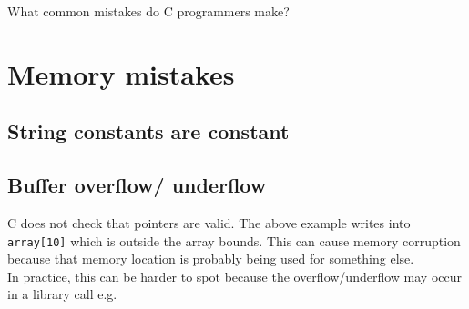 What common mistakes do C programmers make?

\section{Memory mistakes}\label{memory-mistakes}

\subsection{String constants are
constant}\label{string-constants-are-constant}

\begin{Shaded}
\begin{Highlighting}[]
 \NormalTok{; }
\NormalTok{);}

 \NormalTok{; }
\NormalTok{);}
\end{Highlighting}
\end{Shaded}

\subsection{Buffer overflow/ underflow}\label{buffer-overflow-underflow}

\begin{Shaded}
\begin{Highlighting}[]
 
\end{Highlighting}
\end{Shaded}

C does not check that pointers are valid. The above example writes into
\texttt{array{[}10{]}} which is outside the array bounds. This can cause
memory corruption because that memory location is probably being used
for something else.\\In practice, this can be harder to spot because the
overflow/underflow may occur in a library call e.g.

\begin{Shaded}
\begin{Highlighting}[]
\end{Highlighting}
\end{Shaded}

